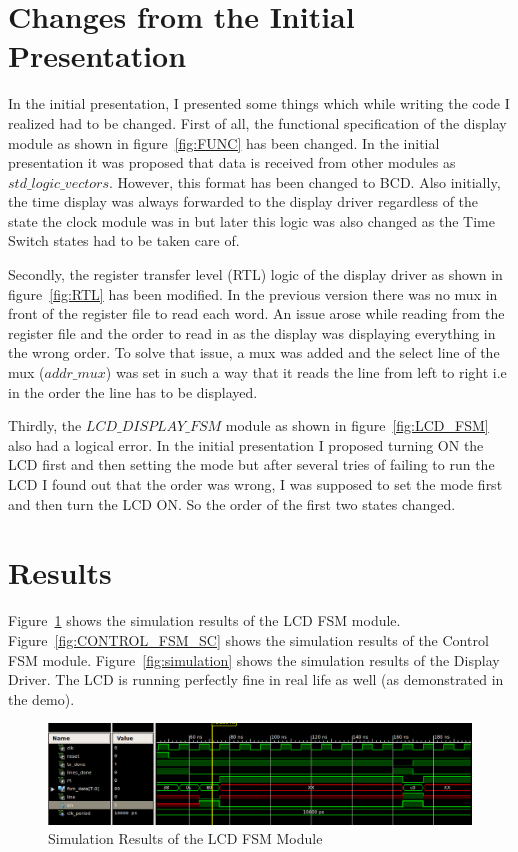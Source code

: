 \documentclass[a4paper]{article}
\begin{document}
\section{Changes from the Initial Presentation}
In the initial presentation, I presented some things which while writing the code I realized had to be changed. First of all, the functional specification of the display module as shown in figure~\ref{fig:FUNC} has been changed. In the initial presentation it was proposed that data is received from other modules as $std\_logic\_vectors$. However, this format has been changed to BCD. Also initially, the time display was always forwarded to the display driver regardless of the state the clock module was in but later this logic was also changed as the Time Switch states had to be taken care of. 
\par
Secondly, the register transfer level (RTL) logic of the display driver as shown in figure~\ref{fig:RTL} has been modified. In the previous version there was no mux in front of the register file to read each word. An issue arose while reading from the register file and the order to read in as the display was displaying everything in the wrong order. To solve that issue, a mux was added and the select line of the mux ($addr\_mux$) was set in such a way that it reads the line from left to right i.e in the order the line has to be displayed. 
\par
Thirdly, the $LCD\_DISPLAY\_FSM$ module as shown in figure~\ref{fig:LCD_FSM} also had a logical error. In the initial presentation I proposed turning ON the LCD first and then setting the mode but after several tries of failing to run the LCD I found out that the order was wrong, I was supposed to set the mode first and then turn the LCD ON. So the order of the first two states changed. 

\section{Results}
Figure~\ref{fig:LCD_FSM_SC} shows the simulation results of the LCD FSM module. 
Figure~\ref{fig:CONTROL_FSM_SC} shows the simulation results of the Control FSM module. Figure~\ref{fig:simulation} shows the simulation results of the Display Driver. The LCD is running perfectly fine in real life as well (as demonstrated in the demo).

\begin{figure}[h!]
  \begin{center}
    \includegraphics[width=\textwidth]{LCD_FSM_SC.png}
    \caption{Simulation Results of the LCD FSM Module}
    \label{fig:LCD_FSM_SC}
  \end{center}
\end{figure}
\end{document}
